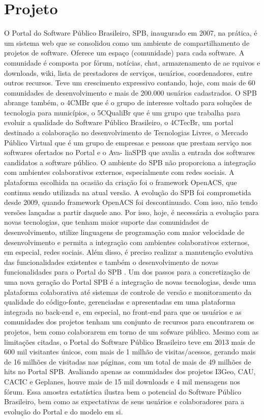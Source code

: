 \section{Projeto}
\label{sec:projeto}


O Portal do Software Público Brasileiro, SPB, inaugurado em 2007, na prática, é um sistema
web que se consolidou como um ambiente de compartilhamento de projetos de software.
Oferece um espaço (comunidade) para cada software. A comunidade é composta por fórum,
notícias, chat, armazenamento de ae rquivos e downloads, wiki, lista de prestadores de
serviços, usuários, coordenadores, entre outros recursos. Teve um crescimento expressivo
contando, hoje, com mais de 60 comunidades de desenvolvimento e mais de 200.000 usuários
cadastrados. O SPB abrange também, o 4CMBr que é o grupo de interesse voltado para
soluções de tecnologia para municípios, o 5CQualiBr que é um grupo que trabalha para
evoluir a qualidade do Software Público Brasileiro, o 4CTecBr, um portal destinado a
colaboração no desenvolvimento de Tecnologias Livres, o Mercado Público Virtual que é um
grupo de empresas e pessoas que prestam serviço nos softwares ofertados no Portal e o Ava- 
liaSPB que avalia a entrada dos softwares candidatos a software público. O ambiente do 
SPB não proporciona a integração com ambientes colaborativos externos, especialmente com
redes sociais. A plataforma escolhida na ocasião da criação foi o framework OpenACS, que
continua sendo utilizada na atual versão.
%
A evolução do SPB foi comprometida desde 2009, quando framework OpenACS foi 
descontinuado. Com isso, não tendo versões lançadas a partir daquele ano. Por isso, hoje,
é necessária a evolução para novas tecnologias, que tenham maior suporte das comunidades
de desenvolvimento, utilize linguagens de programação com maior velocidade de
desenvolvimento e permita a integração com ambientes colaborativos externos, em especial,
redes sociais. Além disso, é preciso realizar a manutenção evolutiva das funcionalidades
existentes e também o desenvolvimento de novas funcionalidades para o Portal do SPB .
%
Um dos passos para a concretização de uma nova geração do Portal SPB é a integração de
novas tecnologias, desde uma plataforma colaborativa até sistemas de controle de versão e
monitoramento da qualidade do código-fonte, gerenciadas e apresentadas em uma plataforma
integrada no back-end e, em especial, no front-end para que os usuários e as comunidades
dos projetos tenham um conjunto de recursos para encontrarem os projetos, bem como
colaborarem em torno de um sofware público.
%
Mesmo com as limitações citadas, o Portal do Software Público Brasileiro teve em 2013 
mais de 600 mil visitantes únicos, com mais de 1 milhão de visitas/acessos, gerando mais
de 16 milhões de visitadas nas páginas, com um total de mais de 49 milhões de hits no
Portal SPB. Avaliando apenas as comunidades dos projetos I3Geo, CAU, CACIC e Geplanes,
houve mais de 15 mil downloads e 4 mil mensagens nos fórum. Essa amostra estatística
ilustra bem o potencial do Software Público Brasileiro, bem como as expectativas de seus
usuários e colaboradores para a evolução do Portal e do modelo em si.